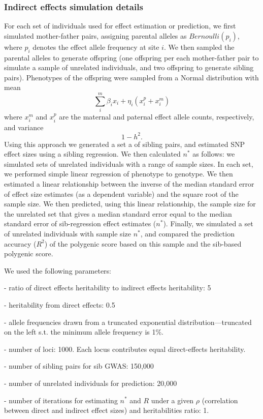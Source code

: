 \documentclass[hidelinks, 12pt]{article}
\begin{document}
\subsubsection{Indirect effects simulation details}
\label{indirect_sim_details}
For each set of individuals used for effect estimation or prediction, we first simulated mother-father pairs, assigning parental alleles as $Bernoulli(p_i)$, where $p_i$ denotes the effect allele frequency at site $i$.  We then sampled the parental alleles to generate offspring (one offspring per each mother-father pair to simulate a sample of unrelated individuals, and two offspring to generate sibling pairs). Phenotypes of the offspring were sampled from a Normal distribution with mean
$$\sum_i^m\beta_ix_i+\eta_i({x}_i^p+{x}_i^m)$$ where ${x}_i^m$ and ${x}_i^p$ are the maternal and paternal effect allele counts, respectively, and variance 
$$1-h^2.$$
Using this approach we generated a set a of sibling pairs, and estimated SNP effect sizes using a sibling regression. We then calculated $n^*$ as follows: we simulated sets of unrelated individuals with a range of sample sizes. In each set, we performed simple linear regression of phenotype to genotype.  We then estimated a linear relationship between the inverse of the median standard error of effect size estimates (as a  dependent variable) and the square root of the sample size.  We then predicted, using this linear relationship, the sample size for the unrelated set that gives a median standard error equal to the median standard error of sib-regression effect estimates ($n^*$).  Finally, we simulated a set of unrelated individuals with sample size $n^*$, and compared the prediction accuracy ($R^2$) of the polygenic score based on this sample and the sib-based polygenic score. 

We used the following parameters:

- ratio of direct effects heritability to indirect effects heritability: 5

- heritability from direct effects: 0.5

- allele frequencies drawn from a truncated exponential distribution---truncated on the left s.t. the minimum allele frequency is 1\%.

- number of loci: 1000.  Each locus contributes equal direct-effects heritability.

- number of sibling pairs for sib GWAS: 150,000

- number of unrelated individuals for prediction: 20,000

- number of iterations for estimating $n^*$ and $R$ under a given $\rho$ (correlation between direct and indirect effect sizes) and heritabilities ratio: 1.
\end{document}
